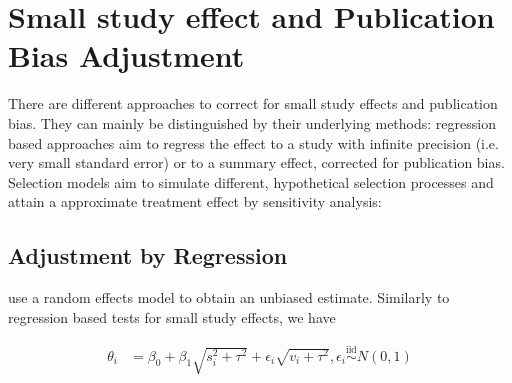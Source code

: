 \documentclass[11pt,a4paper,twoside]{book}\usepackage[]{graphicx}\usepackage[]{color}
\begin{document}






\section{Small study effect and Publication Bias Adjustment}
There are different approaches to correct for small study effects and publication bias. They can mainly be distinguished by their underlying methods: regression based approaches aim to regress the effect to a study with infinite precision (i.e. very small standard error) or to a summary effect, corrected for publication bias. Selection models aim to simulate different, hypothetical selection processes and attain a approximate treatment effect by sensitivity analysis:

\subsection{Adjustment by Regression}
\citet{limitmeta} use a random effects model %
to obtain an unbiased estimate. Similarly to 
regression based tests for small study effects, we have

\begin{align}
\theta_i & = \beta_0 + \beta_1\sqrt{s_i^2 + \tau^2} + \epsilon_i\sqrt{v_i + \tau^2}, \epsilon_i \stackrel{\textrm{iid}}{\sim} N(0,1)  \label{eq:limitmeta.regression}
\end{align}
\end{document}
